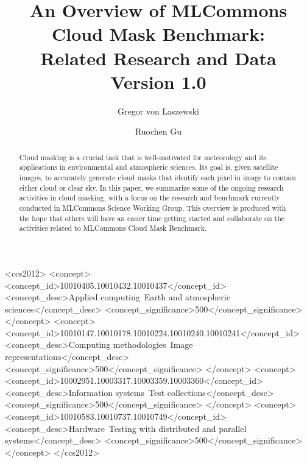 \documentclass[sigplan,screen]{acmart}
\begin{document}
\newcommand{\TITLE}{An Overview of MLCommons Cloud Mask Benchmark: \\ Related Research and Data \\ {\normalsize Version 1.0}}

\title[Overview of MLCommons Cloud Mask: Related Research]{\TITLE}

\author{Gregor von Laszewski}

\author{Ruochen Gu}

\renewcommand{\shortauthors}{von Laszewski et al.}

\begin{abstract}

Cloud masking is a crucial task that is well-motivated for meteorology and its applications in environmental and atmospheric sciences. Its goal is, given satellite images, to accurately generate cloud masks that identify each pixel in image to contain either cloud or clear sky. 
In this paper, we summarize some of the ongoing research activities in cloud masking, with a focus on the research and benchmark currently conducted in MLCommons Science Working Group.
This overview is produced with the hope that others will have an easier time getting started and collaborate on the activities related to MLCommons Cloud Mask Benchmark.

\end{abstract}

\begin{CCSXML}
<ccs2012>
<concept>
<concept_id>10010405.10010432.10010437</concept_id>
<concept_desc>Applied computing~Earth and atmospheric sciences</concept_desc>
<concept_significance>500</concept_significance>
</concept>
<concept>
<concept_id>10010147.10010178.10010224.10010240.10010241</concept_id>
<concept_desc>Computing methodologies~Image representations</concept_desc>
<concept_significance>500</concept_significance>
</concept>
<concept>
<concept_id>10002951.10003317.10003359.10003360</concept_id>
<concept_desc>Information systems~Test collections</concept_desc>
<concept_significance>500</concept_significance>
</concept>
<concept>
<concept_id>10010583.10010737.10010749</concept_id>
<concept_desc>Hardware~Testing with distributed and parallel systems</concept_desc>
<concept_significance>500</concept_significance>
</concept>
</ccs2012>
\end{CCSXML}
\end{document}
